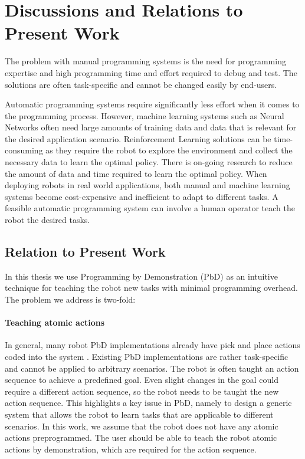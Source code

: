 \section{Discussions and Relations to Present Work}
The problem with manual programming systems is the need for programming expertise and high programming time and effort required to debug and test.
The solutions are often task-specific and cannot be changed easily by end-users.

Automatic programming systems require significantly less effort when it comes to the programming process. 
However, machine learning systems such as Neural Networks often need large amounts of training data and data that is relevant for the desired application scenario.
Reinforcement Learning solutions can be time-consuming as they require the robot to explore the environment and collect the necessary data to learn the optimal policy.
There is on-going research to reduce the amount of data and time required to learn the optimal policy.
When deploying robots in real world applications, both manual and machine learning systems become cost-expensive and inefficient to adapt to different tasks.
A feasible automatic programming system can involve a human operator teach the robot the desired tasks.

\subsection{Relation to Present Work}
In this thesis we use Programming by Demonstration (PbD) as an intuitive technique for teaching the robot new tasks with minimal programming overhead.
The problem we address is two-fold:
\paragraph{Teaching atomic actions}
In general, many robot PbD implementations already have pick and place actions coded into the system \cite{veeraraghavan2008teaching}.
Existing PbD implementations are rather task-specific and cannot be applied to arbitrary scenarios.
The robot is often taught an action sequence to achieve a predefined goal.
Even slight changes in the goal could require a different action sequence, so the robot needs to be taught the new action sequence.
This highlights a key issue in PbD, namely to design a generic system that allows the robot to learn tasks that are applicable to different scenarios.
In this work, we assume that the robot does not have any atomic actions preprogrammed.
The user should be able to teach the robot atomic actions by demonstration, which are required for the action sequence.

